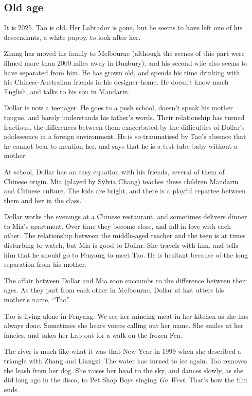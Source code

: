 \documentclass{article}
\begin{document}
\subsection{Old age}
\label{sec:7wgsj9bn}

It is 2025.  Tao is old.  Her Labrador is gone, but he seems to have
left one of his descendants, a white puppy, to look after her.

Zhang has moved his family to Melbourne (although the scenes of this
part were filmed more than 2000 miles away in Bunbury), and his second
wife also seems to have separated from him.  He has grown old, and
spends his time drinking with his Chinese-Australian friends in his
designer-home.  He doesn't know much English, and talks to his son in
Mandarin.

Dollar is now a teenager.  He goes to a posh school, doesn't speak his
mother tongue, and barely understands his father's words.  Their
relationship has turned fractious, the differences between them
exacerbated by the difficulties of Dollar's adolescence in a foreign
environment.  He is so traumatised by Tao's absence that he cannot
bear to mention her, and says that he is a test-tube baby without a
mother.

At school, Dollar has an easy equation with his friends, several of
them of Chinese origin.  Mia (played by Sylvia Chang) teaches these
children Mandarin and Chinese culture.  The kids are bright, and there
is a playful repartee between them and her in the class.

Dollar works the evenings at a Chinese restaurant, and sometimes
delivers dinner to Mia's apartment.  Over time they become close, and
fall in love with each other.  The relationship between the
middle-aged teacher and the teen is at times disturbing to watch, but
Mia is good to Dollar.  She travels with him, and tells him that he
should go to Fenyang to meet Tao.  He is hesitant because of the long
separation from his mother.

The affair between Dollar and Mia soon succumbs to the difference
between their ages.  As they part from each other in Melbourne, Dollar
at last utters his mother's name, ``Tao''.

Tao is living alone in Fenyang.  We see her mincing meat in her
kitchen as she has always done.  Sometimes she hears voices calling
out her name.  She smiles at her fancies, and takes her Lab out for a
walk on the frozen Fen.

The river is much like what it was that New Year in 1999 when she
described a triangle with Zhang and Liangzi.  The water has turned to
ice again.  Tao removes the leash from her dog.  She raises her head
to the sky, and dances slowly, as she did long ago in the disco, to
Pet Shop Boys singing \emph{Go West}.  That's how the film ends.
\end{document}
